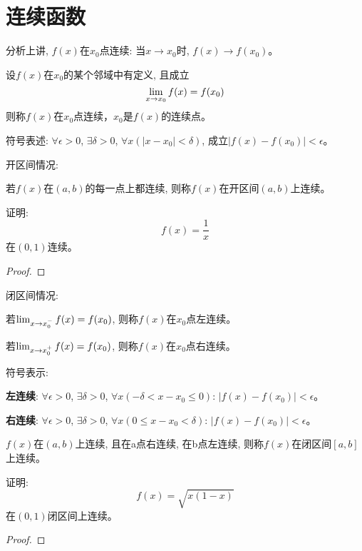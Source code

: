 \documentclass[lang=cn]{elegantbook}
\begin{document}
\section{连续函数}
分析上讲, $f(x)$在$x_0$点连续: 当$x \to x_0$时, $f(x) \to f(x_0)$。
\begin{definition}
    设$f(x)$在$x_0$的某个邻域中有定义, 且成立
    \[ \lim_{x \to x_0 } f(x) = f(x_0) \]
    则称$f(x)$在$x_0$点连续，$x_0$是$f(x)$的连续点。

    符号表述:
    $\forall \epsilon > 0$, $\exists \delta > 0$, $\forall x(\left| x - x_0 \right| < \delta)$, 成立$\left| f(x) - f(x_0) \right| < \epsilon$。
\end{definition}

开区间情况:
\begin{definition}
    若$f(x)$在$(a, b)$的每一点上都连续, 则称$f(x)$在开区间$(a, b)$上连续。
\end{definition}
\begin{proposition}
    证明:
    \[ f(x) = \frac{1}{x}\]
    在$(0, 1)$连续。
\end{proposition}
\begin{proof}
    
\end{proof}

闭区间情况:
\begin{definition}
    若$\lim_{x \to x_0^- } f(x) = f(x_0)$, 则称$f(x)$在$x_0$点左连续。

    若$\lim_{x \to x_0^+ } f(x) = f(x_0)$, 则称$f(x)$在$x_0$点右连续。

    符号表示:

    {\bf 左连续}: $\forall \epsilon > 0$, $\exists \delta > 0$, $\forall x(-\delta < x-x_0 \le 0)$: $\left| f(x) - f(x_0)\right| < \epsilon$。

    {\bf 右连续}: $\forall \epsilon > 0$, $\exists \delta > 0$, $\forall x(0 \le x-x_0 < \delta)$: $\left| f(x) - f(x_0)\right| < \epsilon$。   
\end{definition}

\begin{definition}
    $f(x)$在$(a, b)$上连续, 且在a点右连续, 在b点左连续, 则称$f(x)$在闭区间$[a, b]$上连续。
\end{definition}
\begin{proposition}
    证明:
    \[ f(x) = \sqrt{x(1-x)}\]
    在$(0, 1)$闭区间上连续。
\end{proposition}
\begin{proof}
    
\end{proof}
\end{document}
